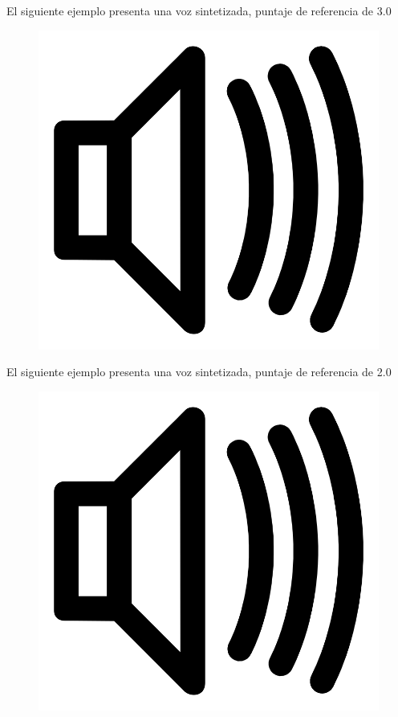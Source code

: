 El siguiente ejemplo presenta una voz sintetizada, puntaje de referencia de 3.0

\begin{figure}[H]
    \centering
    \includegraphics[scale=0.02]{imagenes/ale.jpg}
\end{figure}

El siguiente ejemplo presenta una voz sintetizada, puntaje de referencia de 2.0

\begin{figure}[H]
    \centering
    \includegraphics[scale=0.02]{imagenes/ale.jpg}
\end{figure}


